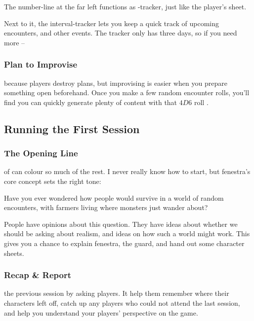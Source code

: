 \begin{multicols}{2}
\vspace{\baselineskip}

\noindent
The number-line at the far left functions as -tracker, just like the player's sheet.

Next to it, the \gls{interval}-tracker lets you keep a quick track of upcoming encounters, and other events.
The tracker only has three days, so if you need more --

\subsubsection{Plan to Improvise}
because players destroy plans, but improvising is easier when you prepare something open beforehand.
Once you make a few random encounter rolls, you'll find you can quickly generate plenty of content with that $4D6$ roll .

\subsection{Running the First Session}

\subsubsection{The Opening Line}
\label{openingLine}
of  can colour so much of the rest.
I never really know how to start, but \gls{fenestra}'s core concept sets the right tone:

\begin{speechtext}
  Have you ever wondered how people would survive in a world of random encounters, with farmers living where monsters just wander about?
\end{speechtext}

People have opinions about this question.
They have ideas about whether we should be asking about realism, and ideas on how such a world might work.
This gives you a chance to explain \gls{fenestra}, the \gls{guard}, and hand out some character sheets.

\subsubsection{Recap \& Report}
the previous session by asking players.
It help them remember where their characters left off, catch up any players who could not attend the last session, and help you understand your players' perspective on the game.


\end{multicols}
